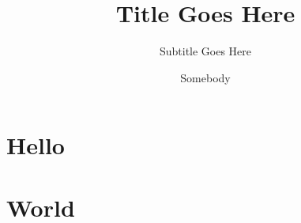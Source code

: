 \documentclass{acm_proc_article-sp}
\title{Title Goes Here}
\subtitle{Subtitle Goes Here}
\author{
\alignauthor
Somebody\\
\email{somebody@example.com}
}
\begin{document}
\maketitle

\section{Hello}
\section{World}

\cite{Dasilva:2008:JAW:1454503.1454528}



  
\end{document}
